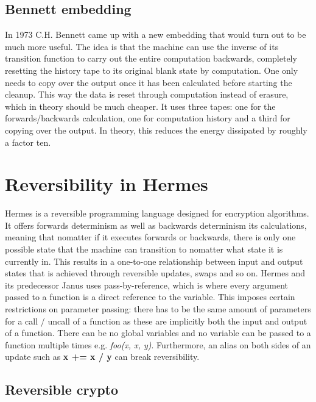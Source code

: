\subsection{Bennett embedding}
In 1973 C.H. Bennett came up with a new embedding that would turn out to be much more useful\cite{Bennett1973LogicalRO}.
The idea is that the machine can use the inverse of its transition function to carry out the entire computation backwards, completely resetting the history tape to its original blank state by computation. One only needs to copy over the output once it has been calculated before starting the cleanup. This way the data is reset through computation instead of erasure, which in theory should be much cheaper.
It uses three tapes: one for the forwards/backwards calculation, one for computation history and a third for copying over the output. 
In theory, this reduces the energy dissipated by roughly a factor ten.

\section{Reversibility in Hermes}
Hermes is a reversible programming language designed for encryption algorithms. It offers forwards determinism as well as backwards determinism its calculations, meaning that nomatter if it executes forwards or backwards,  there is only one possible state that the machine can transition to nomatter what state it is currently in.
This results in a one-to-one relationship between input and output states that is achieved through reversible updates, swaps and so on.
Hermes and its predecessor Janus uses pass-by-reference, which is where every argument passed to a function is a direct reference to the variable.
This imposes certain restrictions on parameter passing: there has to be the same amount of parameters for a call / uncall of a function as these are implicitly both the input and output of a function.
There can be no global variables and no variable can be passed to a function multiple times e.g. \emph{foo(x, x, y)}.
Furthermore, an alias on both sides of an update such as \textbf{x += x / y} can break reversibility.

\subsection{Reversible crypto}



